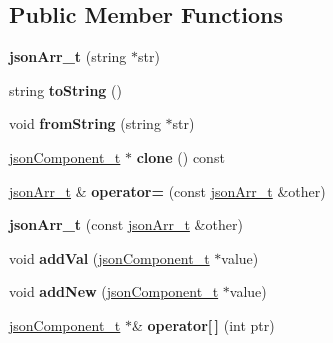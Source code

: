 \subsection*{\-Public \-Member \-Functions}
\begin{DoxyCompactItemize}
\item 
\hypertarget{classjsonArr__t_ab11ea36e3992c9adfdece98c746d1506}{{\bfseries json\-Arr\-\_\-t} (string $\ast$str)}\label{classjsonArr__t_ab11ea36e3992c9adfdece98c746d1506}

\item 
\hypertarget{classjsonArr__t_a1055121680d7f09dedd5818fcadc086e}{string {\bfseries to\-String} ()}\label{classjsonArr__t_a1055121680d7f09dedd5818fcadc086e}

\item 
\hypertarget{classjsonArr__t_aedf32192fdc2dfb1976ac44b01b421fb}{void {\bfseries from\-String} (string $\ast$str)}\label{classjsonArr__t_aedf32192fdc2dfb1976ac44b01b421fb}

\item 
\hypertarget{classjsonArr__t_a85161846a59c7ffe50958bf81cf00976}{\hyperlink{classjsonComponent__t}{json\-Component\-\_\-t} $\ast$ {\bfseries clone} () const }\label{classjsonArr__t_a85161846a59c7ffe50958bf81cf00976}

\item 
\hypertarget{classjsonArr__t_a5047c74c4557c0d60f2e48f97f775fbb}{\hyperlink{classjsonArr__t}{json\-Arr\-\_\-t} \& {\bfseries operator=} (const \hyperlink{classjsonArr__t}{json\-Arr\-\_\-t} \&other)}\label{classjsonArr__t_a5047c74c4557c0d60f2e48f97f775fbb}

\item 
\hypertarget{classjsonArr__t_a303dad320be546cf54db5b1e71461908}{{\bfseries json\-Arr\-\_\-t} (const \hyperlink{classjsonArr__t}{json\-Arr\-\_\-t} \&other)}\label{classjsonArr__t_a303dad320be546cf54db5b1e71461908}

\item 
\hypertarget{classjsonArr__t_a285c762061839c2c461a859520a4c7da}{void {\bfseries add\-Val} (\hyperlink{classjsonComponent__t}{json\-Component\-\_\-t} $\ast$value)}\label{classjsonArr__t_a285c762061839c2c461a859520a4c7da}

\item 
\hypertarget{classjsonArr__t_a932481d4330225404d5008aa5899e962}{void {\bfseries add\-New} (\hyperlink{classjsonComponent__t}{json\-Component\-\_\-t} $\ast$value)}\label{classjsonArr__t_a932481d4330225404d5008aa5899e962}

\item 
\hypertarget{classjsonArr__t_a2485da99837e6aa62804529cdf913b4d}{\hyperlink{classjsonComponent__t}{json\-Component\-\_\-t} $\ast$\& {\bfseries operator\mbox{[}$\,$\mbox{]}} (int ptr)}\label{classjsonArr__t_a2485da99837e6aa62804529cdf913b4d}


\end{DoxyCompactItemize}
